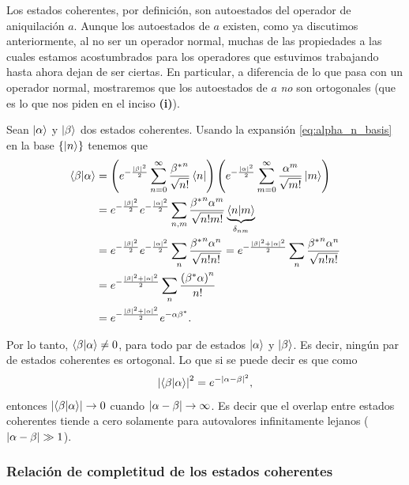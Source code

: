 \documentclass[10pt, a4paper]{article}
\numberwithin{equation}{subsection}
\begin{document}
Los estados coherentes, por definición, son autoestados del operador de
aniquilación $a$. Aunque los autoestados de $a$ existen, como ya discutimos
anteriormente, al no ser un operador normal, muchas de las propiedades a las
cuales estamos acostumbrados para los operadores que estuvimos trabajando hasta
ahora dejan de ser ciertas. En particular, a diferencia de lo que pasa con un
operador normal, mostraremos que los autoestados de $a$ \emph{no} son
ortogonales (que es lo que nos piden en el inciso \textbf{(i)}).

Sean $\ket{\alpha}$ y $\ket{\beta}$ dos estados coherentes. Usando la expansión
\eqref{eq:alpha_n_basis} en la base $\set{\ket{n}}$ tenemos que
\begin{align}
  \braket{\beta}{\alpha} &= \left(e^{-\frac{\abs{\beta}^2}{2}}
    \sum_{n=0}^{\infty} \frac{{{\beta}^{*}}^n}{\sqrt{n!}} \bra{n}\right)
    \left(e^{-\frac{\abs{\alpha}^2}{2}} \sum_{m=0}^{\infty}
    \frac{\alpha^m}{\sqrt{m!}} \ket{m}\right) \nonumber \\
  &= e^{-\frac{\abs{\beta}^2}{2}} e^{-\frac{\abs{\alpha}^2}{2}}
    \sum_{n,m} \frac{{{\beta}^{*}}^n\alpha^m}{\sqrt{n!m!}}
    \underbrace{\braket{n}{m}}_{\delta_{nm}} \nonumber \\
  &= e^{-\frac{\abs{\beta}^2}{2}} e^{-\frac{\abs{\alpha}^2}{2}}
    \sum_{n} \frac{{{\beta}^{*}}^n\alpha^n}{\sqrt{n!n!}}
    = e^{-\frac{\abs{\beta}^2 + \abs{\alpha}^2}{2}}
    \sum_{n} \frac{{{\beta}^{*}}^n\alpha^n}{\sqrt{n!n!}}
    \nonumber \\
  &= e^{-\frac{\abs{\beta}^2 + \abs{\alpha}^2}{2}}
    \sum_{n} \frac{\left({{\beta}^{*}}\alpha\right)^n}{n!}
    \nonumber \\
  &= e^{-\frac{\abs{\beta}^2 + \abs{\alpha}^2}{2}} e^{-\alpha{{\beta}^{*}}}.
\end{align}

Por lo tanto, $\braket{\beta}{\alpha} \neq 0$, para todo par de estados
$\ket{\alpha}$ y $\ket{\beta}$. Es decir, ningún par de estados coherentes es
ortogonal. Lo que si se puede decir es que como
\begin{equation}
  \abs{\braket{\beta}{\alpha}}^2 = e^{-\abs{\alpha - \beta}^2},
\end{equation}
entonces $\abs{\braket{\beta}{\alpha}} \to 0$ cuando $\abs{\alpha - \beta} \to
\infty$. Es decir que el overlap entre estados coherentes tiende a cero
solamente para autovalores infinitamente lejanos ($\abs{\alpha - \beta} \gg
1$).

\subsubsection{Relación de completitud de los estados coherentes}
\end{document}
